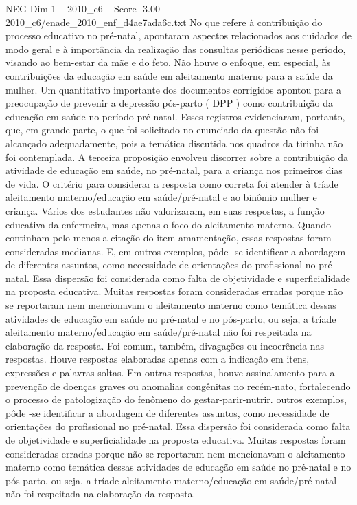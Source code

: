 \begin{textsample}{NEG Dim 1 – 2010\_c6 – Score -3.00 – 2010\_c6/enade\_2010\_enf\_d4ae7ada6c.txt}
No que refere à contribuição do processo educativo no pré-natal, apontaram aspectos relacionados aos cuidados de modo geral e à importância da realização das consultas periódicas nesse período, visando ao bem-estar da mãe e do feto.
Não houve o enfoque, em especial, às contribuições da educação em saúde em aleitamento materno para a saúde da mulher.
Um quantitativo importante dos documentos corrigidos apontou para a preocupação de prevenir a depressão pós-parto ( DPP ) como contribuição da educação em saúde no período pré-natal.
Esses registros evidenciaram, portanto, que, em grande parte, o que foi solicitado no enunciado da questão não foi alcançado adequadamente, pois a temática discutida nos quadros da tirinha não foi contemplada.
A terceira proposição envolveu discorrer sobre a contribuição da atividade de educação em saúde, no pré-natal, para a criança nos primeiros dias de vida.
O critério para considerar a resposta como correta foi atender à tríade aleitamento materno/educação em saúde/pré-natal e ao binômio mulher e criança.
Vários dos estudantes não valorizaram, em suas respostas, a função educativa da enfermeira, mas apenas o foco do aleitamento materno.
Quando continham pelo menos a citação do item amamentação, essas respostas foram consideradas medianas.
E, em outros exemplos, pôde -se identificar a abordagem de diferentes assuntos, como necessidade de orientações do profissional no pré-natal.
Essa dispersão foi considerada como falta de objetividade e superficialidade na proposta educativa.
Muitas respostas foram consideradas erradas porque não se reportaram nem mencionavam o aleitamento materno como temática dessas atividades de educação em saúde no pré-natal e no pós-parto, ou seja, a tríade aleitamento materno/educação em saúde/pré-natal não foi respeitada na elaboração da resposta.
Foi comum, também, divagações ou incoerência nas respostas.
Houve respostas elaboradas apenas com a indicação em itens, expressões e palavras soltas.
Em outras respostas, houve assinalamento para a prevenção de doenças graves ou anomalias congênitas no recém-nato, fortalecendo o processo de patologização do fenômeno do gestar-parir-nutrir. outros exemplos, pôde -se identificar a abordagem de diferentes assuntos, como necessidade de orientações do profissional no pré-natal.
Essa dispersão foi considerada como falta de objetividade e superficialidade na proposta educativa.
Muitas respostas foram consideradas erradas porque não se reportaram nem mencionavam o aleitamento materno como temática dessas atividades de educação em saúde no pré-natal e no pós-parto, ou seja, a tríade aleitamento materno/educação em saúde/pré-natal não foi respeitada na elaboração da resposta.

\end{textsample}
